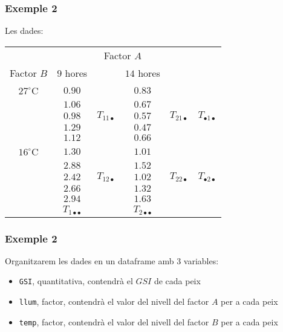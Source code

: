 \documentclass[12pt,t]{beamer}
\theoremstyle{plain}
\theoremstyle{definition}
\begin{document}
\begin{frame}
\frametitle{Exemple 2}
Les dades:

\begin{center}
\begin{tabular}{cccccc}
\cline{1-5}
&\multicolumn{4}{c}{Factor $A$}\\\cline{1-5}
Factor $B$&$9$ hores & &$14$ hores & & \\
\cline{1-5}
$27^\circ$C&$0.90$& & $0.83$& &\\ 
&$1.06$& & $0.67$& &\\
&$0.98$&\hspace*{-0.7cm} $T_{11\bullet}$ & $0.57$&\hspace*{-0.7cm} $T_{21\bullet}$ &$T_{\bullet1\bullet}$\\
&$1.29$& & $0.47$& &\\
&$1.12$& & $0.66$& &\\\cline{1-5}
$16^\circ$C&$1.30$& & $1.01$& &\\
&$2.88$& & $1.52$& &\\
&$2.42$&\hspace*{-0.7cm} $T_{12\bullet}$ & $1.02$&\hspace*{-0.7cm} $T_{22\bullet}$ &$T_{\bullet2\bullet}$\\
&$2.66$& & $1.32$& &\\
&$2.94$& & $1.63$& &\\\cline{1-5}
& $T_{1\bullet\bullet}$ & & $T_{2\bullet\bullet}$ & &
\end{tabular}
\end{center}
\end{frame}

\begin{frame}
\frametitle{Exemple 2}
Organitzarem les dades en un dataframe amb 3 variables:
\medskip

\begin{itemize}
\item {\tt GSI}, quantitativa, contendrà el $GSI$ de
cada peix
\medskip

\item {\tt llum}, factor,  contendrà el valor del nivell del  factor
$A$ per a cada peix
\medskip

\item {\tt temp}, factor,  contendrà el valor del nivell del  factor
$B$ per a cada peix
\end{itemize}
\end{frame}
\end{document}
